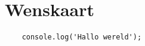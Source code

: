 \section{Wenskaart}%
\label{sec:wenskaart}

\begin{verbatim}
    console.log('Hallo wereld');
\end{verbatim}
